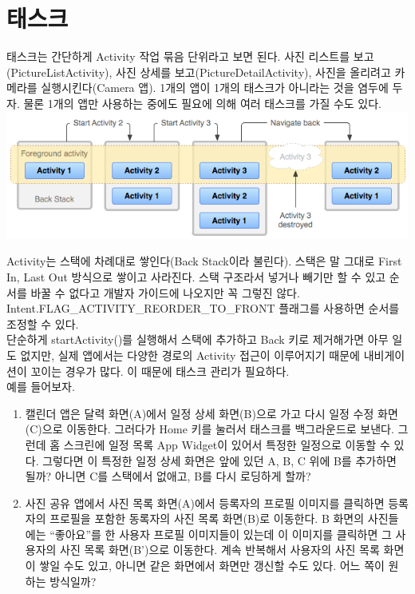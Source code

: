 \section{태스크}
태스크는 간단하게 Activity 작업 묶음 단위라고 보면 된다. 사진 리스트를 보고(PictureListActivity), 사진 상세를 보고(PictureDetailActivity), 사진을 올리려고 카메라를 실행시킨다(Camera 앱).
1개의 앱이 1개의 태스크가 아니라는 것을 염두에 두자. 물론 1개의 앱만 사용하는 중에도 필요에 의해 여러 태스크를 가질 수도 있다.\\
\includegraphics[scale=0.6]{diagram_backstack}

Activity는 스택에 차례대로 쌓인다(Back Stack이라 불린다). 스택은 말 그대로 First In, Last Out 방식으로 쌓이고 사라진다. 스택 구조라서 넣거나 빼기만 할 수 있고 순서를 바꿀 수 없다고 개발자 가이드에 나오지만 꼭 그렇진 않다. Intent.FLAG\_ACTIVITY\_REORDER\_TO\_FRONT 플래그를 사용하면 순서를 조정할 수 있다.\\

단순하게 startActivity()를 실행해서 스택에 추가하고 Back 키로 제거해가면 아무 일도 없지만, 실제 앱에서는 다양한 경로의 Activity 접근이 이루어지기 때문에 내비게이션이 꼬이는 경우가 많다. 이 때문에 태스크 관리가 필요하다.\\

예를 들어보자. 
\begin{enumerate}
\item 캘린더 앱은 달력 화면(A)에서 일정 상세 화면(B)으로 가고 다시 일정 수정 화면(C)으로 이동한다. 그러다가 Home 키를 눌러서 태스크를 백그라운드로 보낸다. 
그런데 홈 스크린에 일정 목록 App Widget이 있어서 특정한 일정으로 이동할 수 있다. 그렇다면 이 특정한 일정 상세 화면은 앞에 있던 A, B, C 위에 B를 추가하면 될까? 아니면 C를 스택에서 없애고, B를 다시 로딩하게 할까?

\item 사진 공유 앱에서 사진 목록 화면(A)에서 등록자의 프로필 이미지를 클릭하면 등록자의 프로필을 포함한 동록자의 사진 목록 화면(B)로 이동한다. B 화면의 사진들에는 ``좋아요''를 한 사용자 프로필 이미지들이 있는데 이 이미지를 클릭하면 그 사용자의 사진 목록 화면(B')으로 이동한다. 계속 반복해서 사용자의 사진 목록 화면이 쌓일 수도 있고, 아니면 같은 화면에서 화면만 갱신할 수도 있다. 어느 쪽이 원하는 방식일까?
\end{enumerate}

